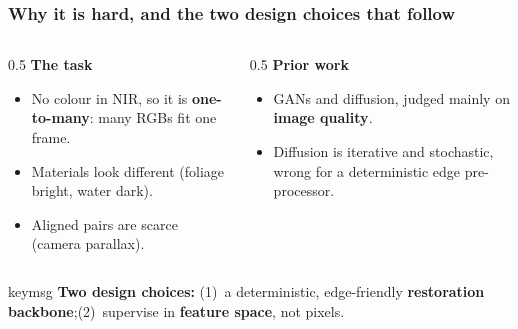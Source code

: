 \documentclass[
	aspectratio=169,
	t,
	onlytextwidth,
	10pt,
]{beamer}
\begin{document}
\begin{frame}
	\frametitle{Why it is hard, and the two design choices that follow}

	\begin{columns}[T]
		\begin{column}{0.5\linewidth}
			\textbf{The task}
			\begin{itemize}
				\item No colour in NIR, so it is \textbf{one-to-many}: many RGBs fit one frame.
				\item Materials look different (foliage bright, water dark).
				\item Aligned pairs are scarce (camera parallax).
			\end{itemize}
		\end{column}
		\begin{column}{0.5\linewidth}
			\textbf{Prior work}
			\begin{itemize}
				\item GANs and diffusion, judged mainly on \textbf{image quality}.
				\item Diffusion is iterative and stochastic, wrong for a deterministic edge pre-processor.
			\end{itemize}
		\end{column}
	\end{columns}

	\vspace{0.6\baselineskip}
	\begin{beamercolorbox}[wd=0.96\linewidth, sep=9pt, rounded=true]{keymsg}
		\centering\textbf{Two design choices:} \;(1)~a deterministic, edge-friendly \textbf{restoration backbone};\quad (2)~supervise in \textbf{feature space}, not pixels.
	\end{beamercolorbox}
\end{frame}

\end{document}
